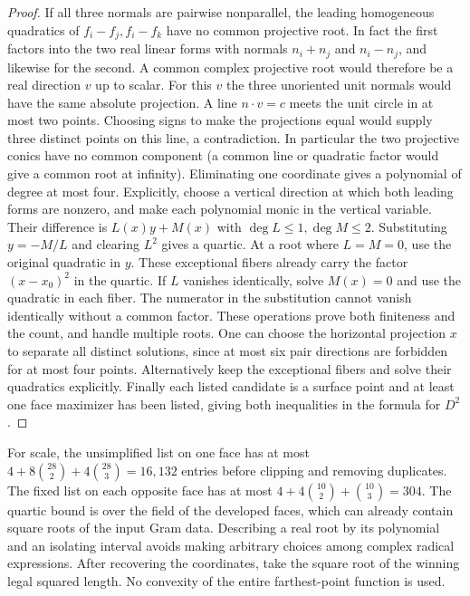 \documentclass[10pt,letterpaper]{article}
\begin{document}
\begin{proof}
If all three normals are pairwise nonparallel, the leading homogeneous
quadratics of $f_i-f_j,f_i-f_k$ have no common projective root. In
fact the first factors into the two real linear forms with normals
$n_i+n_j$ and $n_i-n_j$, and likewise for the second. A common complex
projective root would therefore be a real direction $v$ up to scalar.
For this $v$ the three unoriented unit normals would have the same
absolute projection. A line $n\cdot v=c$ meets the unit circle in at
most two points. Choosing signs to make the projections equal would
supply three distinct points on this line, a contradiction.
In particular the two projective conics have no common component
(a common line or quadratic factor would give a common root at infinity).
Eliminating one coordinate gives a polynomial of degree at most four.
Explicitly, choose a vertical direction at which both leading forms
are nonzero, and make each polynomial monic in the vertical variable.
Their difference is $L(x)y+M(x)$ with $\deg L\le1,\deg M\le2$.
Substituting $y=-M/L$ and clearing $L^2$ gives a quartic.
At a root where $L=M=0$, use the original quadratic in $y$. These
exceptional fibers already carry the factor $(x-x_0)^2$ in the
quartic. If $L$ vanishes identically, solve $M(x)=0$ and use the
quadratic in each fiber. The numerator in the substitution cannot
vanish identically without a common factor. These operations prove
both finiteness and the count, and handle multiple roots. One can
choose the horizontal projection $x$ to separate all distinct
solutions, since at most six pair directions are forbidden for at most
four points. Alternatively keep the exceptional fibers and solve
their quadratics explicitly. Finally each listed candidate is a
surface point and at least one face maximizer has been listed, giving
both inequalities in the formula for $D^2$.
\end{proof}

For scale, the unsimplified list on one face has at most
$4+8\binom{28}{2}+4\binom{28}{3}=16{,}132$ entries before clipping
and removing duplicates. The fixed list on each opposite face has at
most $4+4\binom{10}{2}+\binom{10}{3}=304$. The quartic bound is over
the field of the developed faces, which can already contain square
roots of the input Gram data. Describing a real root by its polynomial
and an isolating interval avoids making arbitrary choices among
complex radical expressions. After recovering the coordinates, take
the square root of the winning legal squared length. No convexity of
the entire farthest-point function is used.
\end{document}
